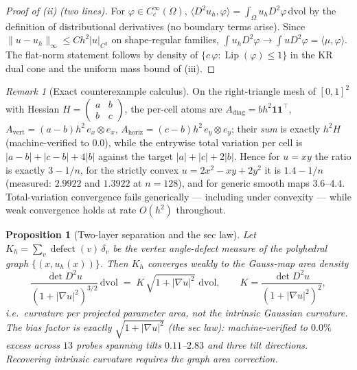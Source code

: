 \documentclass[11pt,a4paper]{article}
\theoremstyle{plain}
\newtheorem{proposition}[theorem]{Proposition}
\theoremstyle{definition}
\theoremstyle{remark}
\newtheorem{remark}[theorem]{Remark}
\newcommand{\Lip}{\operatorname{Lip}}
\newcommand{\dvol}{\,\mathrm{dvol}}
\begin{document}
\begin{proof}[Proof of (ii) (two lines)]
For $\varphi \in C_c^\infty(\Omega)$,
$\langle D^2 u_h, \varphi\rangle = \int_\Omega u_h D^2\varphi \dvol$ by the
definition of distributional derivatives (no boundary terms arise).
Since $\|u - u_h\|_\infty \le C h^2 |u|_{C^2}$ on shape-regular families,
$\int u_h D^2\varphi \to \int u D^2\varphi = \langle \mu, \varphi\rangle$.
The flat-norm statement follows by density of
$\{c\,\varphi : \Lip(\varphi)\le 1\}$ in the KR dual cone and the uniform
mass bound of (iii).
\end{proof}

\begin{remark}[Exact counterexample calculus]\label{rem:tvcounter}
On the right-triangle mesh of $[0,1]^2$ with Hessian
$H = \left(\begin{smallmatrix} a & b\\ b & c\end{smallmatrix}\right)$, the
per-cell atoms are $A_{\mathrm{diag}} = b h^2 \mathbf{1}\mathbf{1}^\top$,
$A_{\mathrm{vert}} = (a-b) h^2\, e_x \otimes e_x$,
$A_{\mathrm{horiz}} = (c-b) h^2\, e_y \otimes e_y$; their \emph{sum} is
exactly $h^2 H$ (machine-verified to $0.0$), while the entrywise total
variation per cell is $|a-b| + |c-b| + 4|b|$ against the target
$|a| + |c| + 2|b|$. Hence for $u = xy$ the ratio is exactly $3 - 1/n$, for
the strictly convex $u = 2x^2 - xy + 2y^2$ it is $1.4 - 1/n$ (measured:
$2.9922$ and $1.3922$ at $n=128$), and for generic smooth maps $3.6$--$4.4$.
Total-variation convergence fails generically --- including under
convexity --- while weak convergence holds at rate $O(h^2)$ throughout.
\end{remark}

\begin{proposition}[Two-layer separation and the sec law]
\label{prop:seclaw}
Let $K_h = \sum_v \operatorname{defect}(v)\,\delta_v$ be the vertex
angle-defect measure of the polyhedral graph
$\{(x, u_h(x))\}$. Then $K_h$ converges weakly to the \emph{Gauss-map area
density}
\[
\frac{\det D^2 u}{\left(1 + |\nabla u|^2\right)^{3/2}} \dvol
\;=\; K\,\sqrt{1+|\nabla u|^2}\,\dvol,
\qquad
K = \frac{\det D^2 u}{(1+|\nabla u|^2)^2},
\]
i.e.\ curvature per projected parameter area, \emph{not} the intrinsic
Gaussian curvature. The bias factor is exactly
$\sqrt{1+|\nabla u|^2}$ (the sec law): machine-verified to $0.0\%$ excess
across $13$ probes spanning tilts $0.11$--$2.83$ and three tilt
directions. Recovering intrinsic curvature requires the graph area
correction.
\end{proposition}
\end{document}
